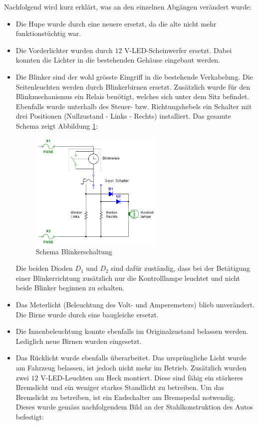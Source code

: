 \newpage

Nachfolgend wird kurz erklärt, was an den einzelnen Abgängen verändert wurde:
\begin{itemize}
\item Die Hupe wurde durch eine neuere ersetzt, da die alte nicht mehr funktionstüchtig war.
\item Die Vorderlichter wurden durch $12$ V-LED-Scheinwerfer ersetzt. Dabei konnten die Lichter in die bestehenden Gehäuse eingebaut werden.
\item Die Blinker sind der wohl grösste Eingriff in die bestehende Verkabelung. Die Seitenleuchten werden durch Blinkerbirnen ersetzt. Zusätzlich wurde für den Blinkmechanismus ein Relais benötigt, welches sich unter dem Sitz befindet. Ebenfalls wurde unterhalb des Steuer- bzw. Richtungshebels ein Schalter mit drei Positionen (Nullzustand - Links - Rechts) installiert. Das gesamte Schema zeigt Abbildung \ref{fig:SchemaBlinkerschaltung}:

\begin{figure}[h]
	\centering
		\includegraphics[width=0.6\textwidth]{images/Blinkerschaltung_Schema}
	\caption{Schema Blinkerschaltung}
	\label{fig:SchemaBlinkerschaltung}
\end{figure}

Die beiden Dioden $D_1$ und $D_2$ sind dafür zuständig, dass bei der Betätigung einer Blinkerrichtung zusätzlich nur die Kontrolllampe leuchtet und nicht beide Blinker beginnen zu schalten.
\item Das Meterlicht (Beleuchtung des Volt- und Amperemeters) blieb unverändert. Die Birne wurde durch eine baugleiche ersetzt.
\item Die Innenbeleuchtung konnte ebenfalls im Originalzustand belassen werden. Lediglich neue Birnen wurden eingesetzt.
\newpage
\item Das Rücklicht wurde ebenfalls überarbeitet. Das ursprüngliche Licht wurde am Fahrzeug belassen, ist jedoch nicht mehr im Betrieb. Zusätzlich wurden zwei $12$ V-LED-Leuchten am Heck montiert. Diese sind fähig ein stärkeres Bremslicht und ein weniger starkes Standlicht zu betreiben. Um das Bremslicht zu betreiben, ist ein Endschalter am Bremspedal notwendig. Dieses wurde gemäss nachfolgendem Bild an der Stahlkonstruktion des Autos befestigt:


\end{itemize}
